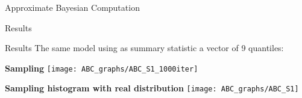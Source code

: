 \begin{section}{Approximate Bayesian Computation}
\begin{frame}{Results}
\end{frame}


\begin{frame}{Results}
The same model using as summary statistic a vector of 9 quantiles:
\begin{center}
	\begin{minipage}{0.63\textwidth}
		\begin{center}
			{\scriptsize \textbf{Sampling}}
			\texttt{[image: ABC\_graphs/ABC\_S1\_1000iter]}
		\end{center}
	\end{minipage}
	
	\vspace{0.2cm}
	
	\begin{minipage}{0.63\textwidth}
		\begin{center}
			{\scriptsize \textbf{Sampling histogram with real distribution}}
			\texttt{[image: ABC\_graphs/ABC\_S1]}
		\end{center}
	\end{minipage}
\end{center}
\end{frame}


\end{section}